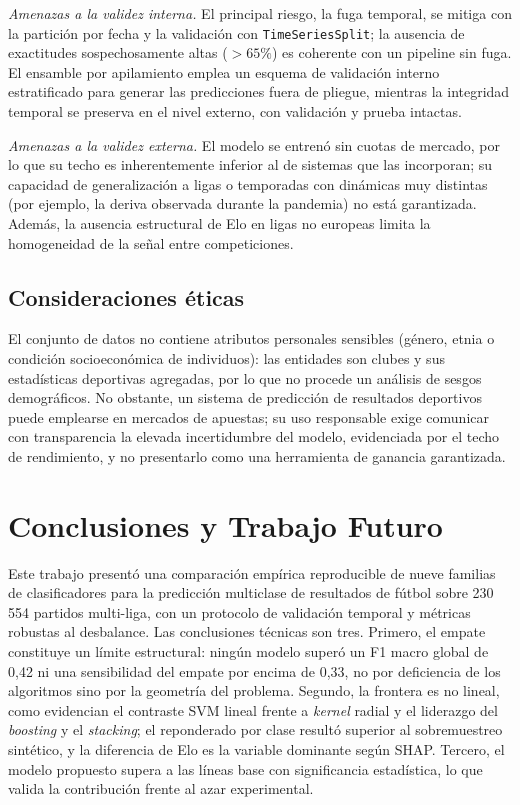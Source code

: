 \documentclass[conference]{IEEEtran}
\begin{document}
\textit{Amenazas a la validez interna.} El principal riesgo, la fuga temporal, se mitiga con
la partici\'on por fecha y la validaci\'on con \texttt{TimeSeriesSplit}; la ausencia de
exactitudes sospechosamente altas ($>65\%$) es coherente con un pipeline sin fuga. El
ensamble por apilamiento emplea un esquema de validaci\'on interno estratificado para generar
las predicciones fuera de pliegue, mientras la integridad temporal se preserva en el nivel
externo, con validaci\'on y prueba intactas.

\textit{Amenazas a la validez externa.} El modelo se entren\'o sin cuotas de mercado, por lo
que su techo es inherentemente inferior al de sistemas que las incorporan; su capacidad de
generalizaci\'on a ligas o temporadas con din\'amicas muy distintas (por ejemplo, la deriva
observada durante la pandemia) no est\'a garantizada. Adem\'as, la ausencia estructural de
Elo en ligas no europeas limita la homogeneidad de la se\~nal entre competiciones.

\subsection{Consideraciones \'eticas}
El conjunto de datos no contiene atributos personales sensibles (g\'enero, etnia o
condici\'on socioecon\'omica de individuos): las entidades son clubes y sus estad\'isticas
deportivas agregadas, por lo que no procede un an\'alisis de sesgos demogr\'aficos. No
obstante, un sistema de predicci\'on de resultados deportivos puede emplearse en mercados de
apuestas; su uso responsable exige comunicar con transparencia la elevada incertidumbre del
modelo, evidenciada por el techo de rendimiento, y no presentarlo como una herramienta
de ganancia garantizada.

\section{Conclusiones y Trabajo Futuro}\label{sec:conclusions}
Este trabajo present\'o una comparaci\'on emp\'irica reproducible de nueve familias de
clasificadores para la predicci\'on multiclase de resultados de f\'utbol sobre 230\,554
partidos multi-liga, con un protocolo de validaci\'on temporal y m\'etricas robustas al
desbalance. Las conclusiones t\'ecnicas son tres. Primero, el empate constituye un l\'imite
estructural: ning\'un modelo super\'o un F1 macro global de 0,42 ni una sensibilidad del
empate por encima de 0,33, no por deficiencia de los algoritmos sino por la geometr\'ia del
problema. Segundo, la frontera es no lineal, como evidencian el contraste SVM lineal frente
a \emph{kernel} radial y el liderazgo del \emph{boosting} y el \emph{stacking}; el
reponderado por clase result\'o superior al sobremuestreo sint\'etico, y la diferencia de
Elo es la variable dominante seg\'un SHAP. Tercero, el modelo propuesto supera a las l\'ineas
base con significancia estad\'istica, lo que valida la contribuci\'on frente al azar
experimental.
\end{document}
